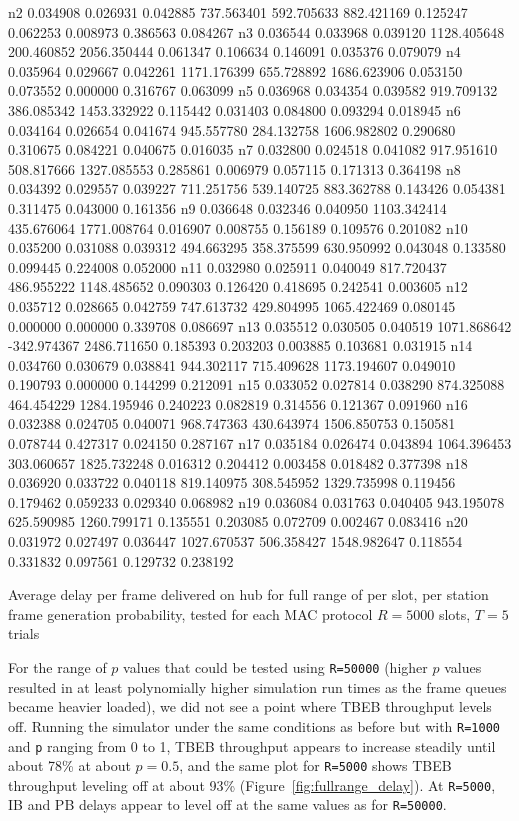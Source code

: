 \documentclass[twocolumn]{article}
\begin{document}
\begin{table}
n2 0.034908 0.026931 0.042885 737.563401 592.705633 882.421169 0.125247 0.062253 0.008973 0.386563 0.084267
n3 0.036544 0.033968 0.039120 1128.405648 200.460852 2056.350444 0.061347 0.106634 0.146091 0.035376 0.079079
n4 0.035964 0.029667 0.042261 1171.176399 655.728892 1686.623906 0.053150 0.073552 0.000000 0.316767 0.063099
n5 0.036968 0.034354 0.039582 919.709132 386.085342 1453.332922 0.115442 0.031403 0.084800 0.093294 0.018945
n6 0.034164 0.026654 0.041674 945.557780 284.132758 1606.982802 0.290680 0.310675 0.084221 0.040675 0.016035
n7 0.032800 0.024518 0.041082 917.951610 508.817666 1327.085553 0.285861 0.006979 0.057115 0.171313 0.364198
n8 0.034392 0.029557 0.039227 711.251756 539.140725 883.362788 0.143426 0.054381 0.311475 0.043000 0.161356
n9 0.036648 0.032346 0.040950 1103.342414 435.676064 1771.008764 0.016907 0.008755 0.156189 0.109576 0.201082
n10 0.035200 0.031088 0.039312 494.663295 358.375599 630.950992 0.043048 0.133580 0.099445 0.224008 0.052000
n11 0.032980 0.025911 0.040049 817.720437 486.955222 1148.485652 0.090303 0.126420 0.418695 0.242541 0.003605
n12 0.035712 0.028665 0.042759 747.613732 429.804995 1065.422469 0.080145 0.000000 0.000000 0.339708 0.086697
n13 0.035512 0.030505 0.040519 1071.868642 -342.974367 2486.711650 0.185393 0.203203 0.003885 0.103681 0.031915
n14 0.034760 0.030679 0.038841 944.302117 715.409628 1173.194607 0.049010 0.190793 0.000000 0.144299 0.212091
n15 0.033052 0.027814 0.038290 874.325088 464.454229 1284.195946 0.240223 0.082819 0.314556 0.121367 0.091960
n16 0.032388 0.024705 0.040071 968.747363 430.643974 1506.850753 0.150581 0.078744 0.427317 0.024150 0.287167
n17 0.035184 0.026474 0.043894 1064.396453 303.060657 1825.732248 0.016312 0.204412 0.003458 0.018482 0.377398
n18 0.036920 0.033722 0.040118 819.140975 308.545952 1329.735998 0.119456 0.179462 0.059233 0.029340 0.068982
n19 0.036084 0.031763 0.040405 943.195078 625.590985 1260.799171 0.135551 0.203085 0.072709 0.002467 0.083416
n20 0.031972 0.027497 0.036447 1027.670537 506.358427 1548.982647 0.118554 0.331832 0.097561 0.129732 0.238192

    \caption{Average delay per frame delivered on hub for full range of per
    slot, per station frame generation probability, tested for each MAC
    protocol  $R=5000$ slots, $T = 5$ trials }

\end{table}

For the range of $p$ values that could be tested using \verb|R=50000| (higher
$p$ values resulted in at least polynomially higher simulation run times as the frame queues
became heavier loaded), we did not see a point where TBEB throughput levels off. Running
the simulator under the same conditions as before but with \verb|R=1000| and \verb|p| ranging
from 0 to 1, TBEB throughput appears to increase steadily until about 78\% at about $p = 0.5$,
and the same plot for \verb|R=5000| shows TBEB throughput leveling off at about 93\% 
(Figure~\ref{fig:fullrange_delay}). At \verb|R=5000|, IB and PB delays appear to level off at the
same values as for \verb|R=50000|.
\end{document}
